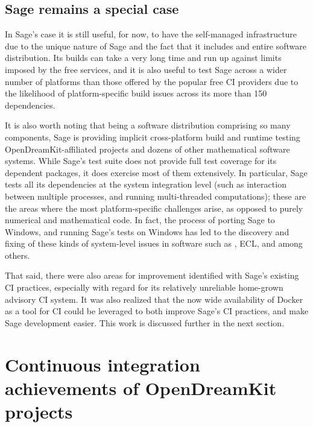 \documentclass{deliverablereport}
\begin{document}

\subsection{Sage remains a special case}
In Sage's case it is still useful, for now, to have the self-managed
infrastructure due to the unique nature of Sage and the fact that it includes
and entire software distribution.  Its builds can take a very long time and run
up against limits imposed by the free services, and it is also useful to test
Sage across a wider number of platforms than those offered by the popular free
CI providers due to the likelihood of platform-specific build issues across its
more than 150 dependencies.

It is also worth noting that being a software distribution comprising so many
components, Sage is providing implicit cross-platform build and runtime testing
OpenDreamKit-affiliated projects and dozens of other mathematical software
systems.  While Sage's test suite does not provide full test coverage for its
dependent packages, it does exercise most of them extensively.  In particular,
Sage tests all its dependencies at the system integration level (such as
interaction between multiple processes, and running multi-threaded
computations); these are the areas where the most platform-specific challenges
arise, as opposed to purely numerical and mathematical code.  In fact, the
process of porting Sage to Windows, and running Sage's tests on Windows
 has led to the discovery and fixing of these kinds of
system-level issues in software such as \GAP, ECL, and \PariGP among
others.

That said, there were also areas for improvement identified with Sage's
existing CI practices, especially with regard for its relatively unreliable
home-grown advisory CI system.  It was also realized that the now wide
availability of Docker as a tool for CI could be leveraged to both improve
Sage's CI practices, and make Sage development easier.  This work is discussed
further in the next section.




\hypertarget{project-reports}{%
\section{Continuous integration achievements of OpenDreamKit projects}\label{project-reports}}
\end{document}
